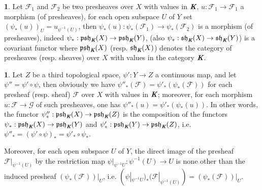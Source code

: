 \documentclass[12pt]{amsart}
\newcommand{\psh}{\operatorname{\mathfrak{psh}}}
\newcommand{\sh}{\operatorname{\mathfrak{sh}}}
\theoremstyle{definition}
\newtheorem{bk}[proposition]{}
\begin{document}
\begin{bk}\label{I: 3.4.2} Let $\mathscr{F}_{1}$ and $\mathscr{F}_{2}$ be two presheaves over $X$ with values in $\emph{\textbf{K}}$, $u:\mathscr{F}_{1}\rightarrow\mathscr{F}_{1}$ a morphism (of presheaves), for each open subspace $U$ of $Y$ set $(\psi_{\ast}(u))_{U}=u_{\psi^{-1}(U)}$, then $\psi_{\ast}(u):\psi_{\ast}(\mathscr{F}_{1})
\rightarrow\psi_{\ast}(\mathscr{F}_{2})$ is a morphism (of presheaves), indeed $\psi_{\ast}:\psh_{\emph{\textbf{K}}}(X)
\rightarrow\psh_{\emph{\textbf{K}}}(Y)$, (also $\psi_{\ast}:\sh_{\emph{\textbf{K}}}(X)
\rightarrow\sh_{\emph{\textbf{K}}}(Y)$) is a covariant functor  where $\psh_{\emph{\textbf{K}}}(X)$ (resp. $\sh_{\emph{\textbf{K}}}(X)$) denotes the category of presheaves (resp. sheaves) over $X$ with values in the category
$\emph{\textbf{K}}$.

\end{bk}

\begin{bk}\label{I: 3.4.3} Let $Z$ be a third topological space, $\psi':Y\rightarrow Z$ a continuous map, and let $\psi''=\psi'\circ\psi$, then obviously we have $\psi''_{\ast}(\mathscr{F})=\psi'_{\ast}(\psi_{\ast}(\mathscr{F}))$ for each presheaf (resp. sheaf) $\mathscr{F}$ over $X$ with values in $\emph{\textbf{K}}$; moreover, for each morphism $u:\mathscr{F}\rightarrow\mathscr{G}$ of such presheaves, one has $\psi''_{\ast}(u)=\psi'_{\ast}(\psi_{\ast}(u))$. In other words, the functor $\psi''_{\ast}:\psh_{\emph{\textbf{K}}}(X)
\rightarrow\psh_{\emph{\textbf{K}}}(Z)$ is the composition of the functors $\psi_{\ast}:\psh_{\emph{\textbf{K}}}(X)
\rightarrow\psh_{\emph{\textbf{K}}}(Y)$ and $\psi'_{\ast}:\psh_{\emph{\textbf{K}}}(Y)
\rightarrow\psh_{\emph{\textbf{K}}}(Z)$, i.e. $\psi''_{\ast}=(\psi'\circ\psi)_{\ast}=\psi'_{\ast}\circ\psi_{\ast}$. 

Moreover, for each open subspace $U$ of $Y$, the direct image of the presheaf $\mathscr{F}|_{\psi^{-1}(U)}$ by the restriction map $\psi|_{\psi^{-1}U}:\psi^{-1}(U)\rightarrow U$ is none other than the induced presheaf $(\psi_{\ast}(\mathscr{F}))|_{U}$, i.e. $(\psi|_{\psi^{-1}U})_{\ast}(\mathscr{F}|_{\psi^{-1}(U)})=
(\psi_{\ast}(\mathscr{F}))|_{U}$.  

\end{bk}
\end{document}
